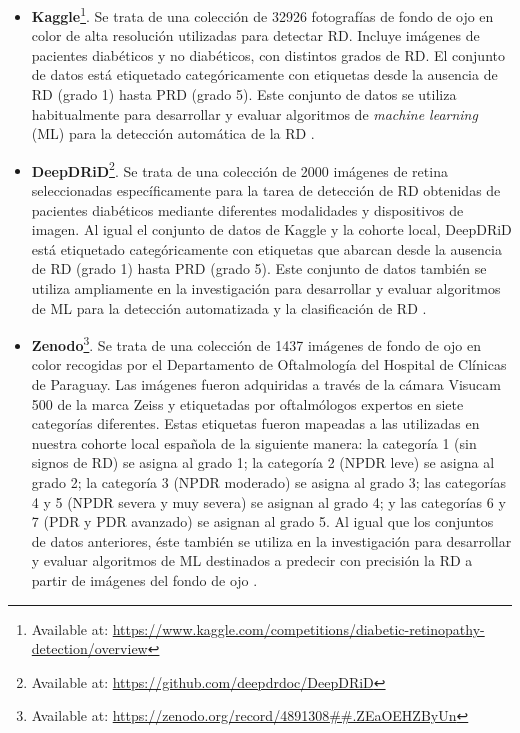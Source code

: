 \begin{itemize}[itemsep=0.25em]
    \item \textbf{Kaggle}\footnote{Available at: \url{https://www.kaggle.com/competitions/diabetic-retinopathy-detection/overview}}. Se trata de una colección de 32926 fotografías de fondo de ojo en color de alta resolución utilizadas para detectar RD. Incluye imágenes de pacientes diabéticos y no diabéticos, con distintos grados de RD. El conjunto de datos está etiquetado categóricamente con etiquetas desde la ausencia de RD (grado 1) hasta PRD (grado 5). Este conjunto de datos se utiliza habitualmente para desarrollar y evaluar algoritmos de \textit{machine learning} (ML) para la detección automática de la RD \cite{datos:kaggle}.
    \item \textbf{DeepDRiD}\footnote{Available at: \url{https://github.com/deepdrdoc/DeepDRiD}}. Se trata de una colección de 2000 imágenes de retina seleccionadas específicamente para la tarea de detección de RD obtenidas de pacientes diabéticos mediante diferentes modalidades y dispositivos de imagen. Al igual el conjunto de datos de Kaggle y la cohorte local, DeepDRiD está etiquetado categóricamente con etiquetas que abarcan desde la ausencia de RD (grado 1) hasta PRD (grado 5). Este conjunto de datos también se utiliza ampliamente en la investigación para desarrollar y evaluar algoritmos de ML para la detección automatizada y la clasificación de RD \cite{datos:deepdrid}.
    \item \textbf{Zenodo}\footnote{Available at: \url{https://zenodo.org/record/4891308##.ZEaOEHZByUn}}. Se trata de una colección de 1437 imágenes de fondo de ojo en color recogidas por el Departamento de Oftalmología del Hospital de Clínicas de Paraguay. Las imágenes fueron adquiridas a través de la cámara Visucam 500 de la marca Zeiss y etiquetadas por oftalmólogos expertos en siete categorías diferentes. Estas etiquetas fueron mapeadas a las utilizadas en nuestra cohorte local española de la siguiente manera: la categoría 1 (sin signos de RD) se asigna al grado 1; la categoría 2 (NPDR leve) se asigna al grado 2; la categoría 3 (NPDR moderado) se asigna al grado 3; las categorías 4 y 5 (NPDR severa y muy severa) se asignan al grado 4; y las categorías 6 y 7 (PDR y PDR avanzado) se asignan al grado 5. Al igual que los conjuntos de datos anteriores, éste también se utiliza en la investigación para desarrollar y evaluar algoritmos de ML destinados a predecir con precisión la RD a partir de imágenes del fondo de ojo \cite{datos:zenodo}.
\end{itemize}

